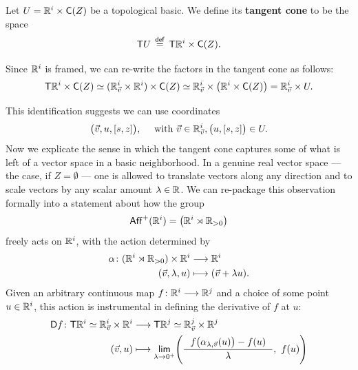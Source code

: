 \begin{definition}
    Let $U = \mathbb R^{i} \times \mathsf C(Z)$ be a topological basic. We define its \textbf{tangent cone} to be the space
    \begin{equation}
        \mathsf T U \,\overset{\sf def}{=}\, \mathsf T\mathbb R^{i} \times \mathsf C(Z).
    \end{equation}
\end{definition}

Since $\mathbb R^{i}$ is framed, we can re-write the factors in the tangent cone as follows:
\begin{equation}
    \mathsf T \mathbb R^{i} \times \mathsf C(Z) \simeq (\mathbb R^{i}_{\vec{v}} \times \mathbb R^{i}) \times \mathsf C(Z) \simeq \mathbb R^{i}_{\vec{v}} \times \big(\mathbb R^{i} \times \mathsf C(Z)\big) = \mathbb R^{i}_{\vec{v}} \times U.
\end{equation} 
\begin{observation}
This identification suggests we can use coordinates 
\begin{equation}
    \big(\vec{v},u,[s,z]\big),\quad \text{ with } \vec{v} \in \mathbb R^{i}_{\vec{v}},\big(u,[s,z]\big)\in U.
\end{equation}
Now we explicate the sense in which the tangent cone captures some of what is left of a vector space in a basic neighborhood. In a genuine real vector space — the case, if $Z=\emptyset$ — one is allowed to translate vectors along any direction and to scale vectors by any scalar amount $\lambda \in \mathbb R$. We can re-package this observation formally into a statement about how the group
\begin{equation}
    \mathsf{Aff}^{+}(\mathbb R^{i}) = \big(\mathbb R^{i} \rtimes \mathbb R_{>0}\big)
\end{equation} 
freely acts on $\mathbb R^{i}$, with the action determined by 
\begin{align}
    \alpha \colon (\mathbb R^{i} \rtimes \mathbb R_{>0}) \times \mathbb R^{i} &\longrightarrow \mathbb R^{i} \\
    (\vec{v},\lambda,u) &\longmapsto (\vec{v} + \lambda u).
\end{align}
Given an arbitrary continuous map $f\colon \mathbb R^{i} \longrightarrow \mathbb R^{j}$ and a choice of some point $u\in \mathbb R^{i}$, this action is instrumental in defining the derivative of $f$ at $u$:
\begin{align}
    \label{ch4:: eq: quotient derivative}
    \sD f\maps \sT\RR^{i} \simeq \RR^{i}_{\vec{v}} \times \RR^{i} &\longra \sT\RR^{j} \simeq \RR^{j}_{\vec{v}} \times \RR^{j} \\
    \label{ch4:: eq: quotient derivative 2}
    (\vec{v},u) &\longmapsto \underset{\lambda \ra 0^+}{\mathsf{lim}} \Bigg(\frac{~~f\big(\alpha_{\lambda,\vec{v}}(u)\big)-f(u)~~}{\lambda},\,\, f(u)\Bigg)

\end{align}
\end{observation}
